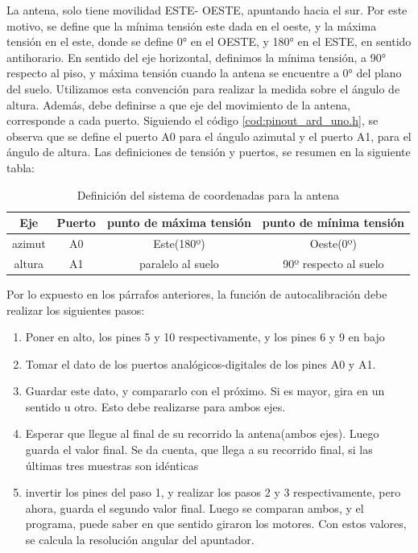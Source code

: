 La antena, solo tiene movilidad ESTE- OESTE, apuntando hacia el sur. Por este motivo, se define que la mínima tensión este dada en el oeste, y la máxima tensión en el este, donde se define 0° en el OESTE, y 180° en el ESTE, en sentido antihorario. En sentido del eje horizontal, definimos la mínima tensión, a 90° respecto al piso, y máxima tensión cuando la antena se encuentre a 0° del plano del suelo. Utilizamos esta convención para realizar la medida sobre el ángulo de altura. Además, debe definirse a que eje del movimiento de la antena, corresponde a cada puerto. Siguiendo el código \ref{cod:pinout_ard_uno.h}, se observa que se define el puerto A0 para el ángulo azimutal y el puerto A1, para el ángulo de altura. Las definiciones de tensión y puertos, se resumen en la siguiente tabla: 
\begin{table}[ht]
	\centering 
	\begin{tabular}{|c|c|c|c|}
		\hline
		Eje & Puerto & punto de máxima tensión & punto de mínima tensión\\ 
		\hline
		azimut &A0 & Este(180º) & Oeste(0º) 	 \\    
		\hline
		altura  &A1 &  paralelo al suelo& 90º respecto al suelo  \\
		\hline
	\end{tabular}
	\caption{Definición del sistema de coordenadas para la antena}
	\label{tab:def_sist_coord}
\end{table}

Por lo expuesto en los párrafos anteriores, la función de autocalibración debe realizar los siguientes pasos: 

\begin{enumerate}
	\item Poner en alto, los pines 5 y 10 respectivamente, y los pines 6 y 9 en bajo  
	\item Tomar el dato de los puertos analógicos-digitales de los pines A0 y A1. 
	\item Guardar este dato, y compararlo con el próximo. Si es mayor, gira en un sentido u otro. Esto debe realizarse para ambos ejes. 
	\item Esperar que llegue al final de su recorrido la antena(ambos ejes). Luego guarda el valor final. Se da cuenta, que llega a su recorrido final, si las últimas tres muestras son idénticas
   \item invertir los pines del paso 1, y realizar los pasos 2 y 3 respectivamente, pero ahora, guarda el segundo valor final. Luego se comparan ambos, y el programa, puede saber en que sentido giraron los motores. Con estos valores, se calcula la resolución angular del apuntador. 
\end{enumerate}


